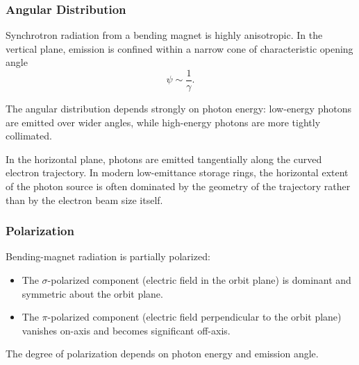 \subsubsection{Angular Distribution}

Synchrotron radiation from a bending magnet is highly anisotropic. In the vertical plane, emission is confined within a narrow cone of characteristic opening angle
\begin{equation}
\psi \sim \frac{1}{\gamma}.
\end{equation}

The angular distribution depends strongly on photon energy: low-energy photons are emitted over wider angles, while high-energy photons are more tightly collimated.

In the horizontal plane, photons are emitted tangentially along the curved electron trajectory. In modern low-emittance storage rings, the horizontal extent of the photon source is often dominated by the geometry of the trajectory rather than by the electron beam size itself.

\subsubsection{Polarization}

Bending-magnet radiation is partially polarized:
\begin{itemize}
\item The $\sigma$-polarized component (electric field in the orbit plane) is dominant and symmetric about the orbit plane.
\item The $\pi$-polarized component (electric field perpendicular to the orbit plane) vanishes on-axis and becomes significant off-axis.
\end{itemize}

The degree of polarization depends on photon energy and emission angle.



